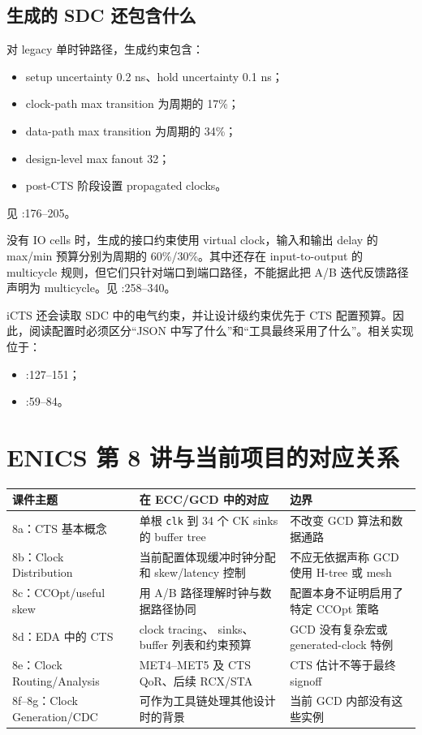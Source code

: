 \documentclass[UTF8,a4paper,11pt,fontset=fandol]{ctexart}
\newcommand{\code}[1]{\nolinkurl{#1}}
\begin{document}
\subsection{生成的 SDC 还包含什么}

对 legacy 单时钟路径，生成约束包含：
\begin{itemize}
  \item setup uncertainty 0.2 ns、hold uncertainty 0.1 ns；
  \item clock-path max transition 为周期的 17\%；
  \item data-path max transition 为周期的 34\%；
  \item design-level max fanout 32；
  \item post-CTS 阶段设置 propagated clocks。
\end{itemize}
见 :176--205。

没有 IO cells 时，生成的接口约束使用 virtual clock，输入和输出 delay 的 max/min 预算分别为周期的 60\%/30\%。其中还存在 input-to-output 的 multicycle 规则，但它们只针对端口到端口路径，不能据此把 A/B 迭代反馈路径声明为 multicycle。见 :258--340。

iCTS 还会读取 SDC 中的电气约束，并让设计级约束优先于 CTS 配置预算。因此，阅读配置时必须区分“JSON 中写了什么”和“工具最终采用了什么”。相关实现位于：
\begin{itemize}
  \item {}:127--151；
  \item {}:59--84。
\end{itemize}

\section{ENICS 第 8 讲与当前项目的对应关系}

\begin{center}
\begin{tabularx}{\textwidth}{p{}p{}X}
\toprule
课件主题 & 在 ECC/GCD 中的对应 & 边界 \\
\midrule
8a：CTS 基本概念 & 单根 \code{clk} 到 34 个 CK sinks 的 buffer tree & 不改变 GCD 算法和数据通路 \\
8b：Clock Distribution & 当前配置体现缓冲时钟分配和 skew/latency 控制 & 不应无依据声称 GCD 使用 H-tree 或 mesh \\
8c：CCOpt/useful skew & 用 A/B 路径理解时钟与数据路径协同 & 配置本身不证明启用了特定 CCOpt 策略 \\
8d：EDA 中的 CTS & clock tracing、 sinks、buffer 列表和约束预算 & GCD 没有复杂宏或 generated-clock 特例 \\
8e：Clock Routing/Analysis & MET4--MET5 及 CTS QoR、后续 RCX/STA & CTS 估计不等于最终 signoff \\
8f--8g：Clock Generation/CDC & 可作为工具链处理其他设计时的背景 & 当前 GCD 内部没有这些实例 \\
\bottomrule
\end{tabularx}
\end{center}
\end{document}

